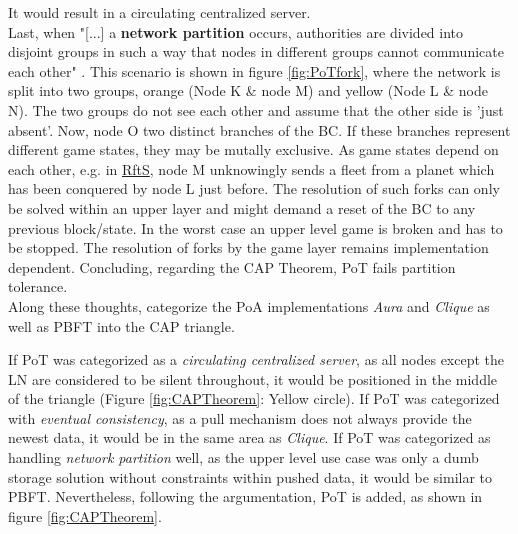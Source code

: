 It would result in a circulating centralized server. \\
Last, when "[...] a \textbf{network partition} occurs, authorities are divided into disjoint groups in such a way that nodes in different groups cannot communicate each other" \cite[7]{Angelis.2018}.
This scenario is shown in figure \ref{fig:PoTfork}, where the network is split into two groups, orange (Node K \& node M) and yellow (Node L \& node N).
The two groups do not see each other and assume that the other side is 'just absent'.
Now, node O two distinct branches of the \gls{BC}.
If these branches represent different game states, they may be mutally exclusive.
As game states depend on each other, e.g. in \hyperref[def:RftS]{RftS}, node M unknowingly sends a fleet from a planet which has been conquered by node L just before.
The resolution of such forks can only be solved within an upper layer and might demand a reset of the \gls{BC} to any previous block/state.
In the worst case an upper level game is broken and has to be stopped.
The resolution of forks by the game layer remains implementation dependent.
Concluding, regarding the CAP Theorem, \gls{PoT} fails partition tolerance. \\
Along these thoughts, \citet[7-8]{Angelis.2018} categorize the \gls{PoA} implementations \textit{Aura} and \textit{Clique} as well as \gls{PBFT} into the CAP triangle.
\begin{figure}
\end{figure}
If \gls{PoT} was categorized as a \textit{circulating centralized server}, as all nodes except the \gls{LN} are considered to be silent throughout,
it would be positioned in the middle of the triangle (Figure \ref{fig:CAPTheorem}: Yellow circle).
If \gls{PoT} was categorized with \textit{eventual consistency}, as a pull mechanism does not always provide the newest data,
it would be in the same area as \textit{Clique}.
If \gls{PoT} was categorized as handling \textit{network partition} well, as the upper level use case was only a dumb storage solution without constraints within pushed data,
it would be similar to \gls{PBFT}.
Nevertheless, following the argumentation, \gls{PoT} is added, as shown in figure \ref{fig:CAPTheorem}.



